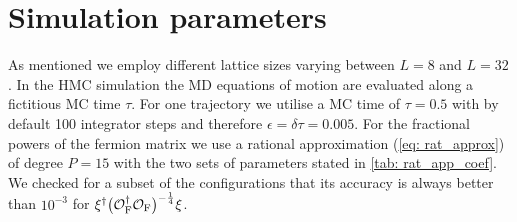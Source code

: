 \section{Simulation parameters}
As mentioned we employ different lattice sizes varying between $L=8$ and $L=32$. In the HMC simulation the MD equations of motion are evaluated along a fictitious MC time $\tau$. For one trajectory we utilise a MC time of $\tau = 0.5$ with by default 100 integrator steps and therefore $\epsilon=\delta\tau = 0.005$. For the fractional powers of the fermion matrix we use a rational approximation (\ref{eq: rat_approx}) of degree $P=15$ with the two sets of parameters stated in \autoref{tab: rat_app_coef}. We checked for a subset of the configurations that its accuracy is always better than $10^{-3}$ for $\xi^{\dagger}\big(\mathcal{O}_{\rm F}^{\dagger}\mathcal{O}_{\rm F}\big)^{-\frac{1}{4}}\xi$.
%
%
